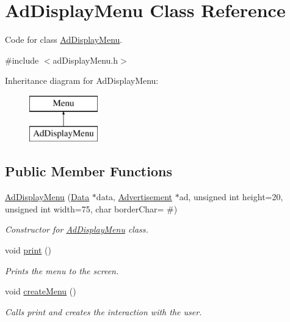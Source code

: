 \hypertarget{class_ad_display_menu}{}\section{Ad\+Display\+Menu Class Reference}
\label{class_ad_display_menu}


Code for class \hyperlink{class_ad_display_menu}{Ad\+Display\+Menu}.  




{\ttfamily \#include $<$ad\+Display\+Menu.\+h$>$}

Inheritance diagram for Ad\+Display\+Menu\+:\begin{figure}[H]
\begin{center}
\leavevmode
\includegraphics[height=2.000000cm]{class_ad_display_menu}
\end{center}
\end{figure}
\subsection*{Public Member Functions}
\begin{DoxyCompactItemize}
\item 
\hyperlink{class_ad_display_menu_a7e62fc564074691ff0ae3a6b82effdcf}{Ad\+Display\+Menu} (\hyperlink{class_data}{Data} $\ast$data, \hyperlink{class_advertisement}{Advertisement} $\ast$ad, unsigned int height=20, unsigned int width=75, char border\+Char= \textquotesingle{}\#\textquotesingle{})
\begin{DoxyCompactList}\small\item\em Constructor for \hyperlink{class_ad_display_menu}{Ad\+Display\+Menu} class. \end{DoxyCompactList}\item 
\hypertarget{class_ad_display_menu_acf175cade9d9e5a6d65f1eb901f17a84}{}void \hyperlink{class_ad_display_menu_acf175cade9d9e5a6d65f1eb901f17a84}{print} ()\label{class_ad_display_menu_acf175cade9d9e5a6d65f1eb901f17a84}

\begin{DoxyCompactList}\small\item\em Prints the menu to the screen. \end{DoxyCompactList}\item 
\hypertarget{class_ad_display_menu_ae10113101504905c1cf802085c603a8b}{}void \hyperlink{class_ad_display_menu_ae10113101504905c1cf802085c603a8b}{create\+Menu} ()\label{class_ad_display_menu_ae10113101504905c1cf802085c603a8b}

\begin{DoxyCompactList}\small\item\em Calls print and creates the interaction with the user. \end{DoxyCompactList}\end{DoxyCompactItemize}
